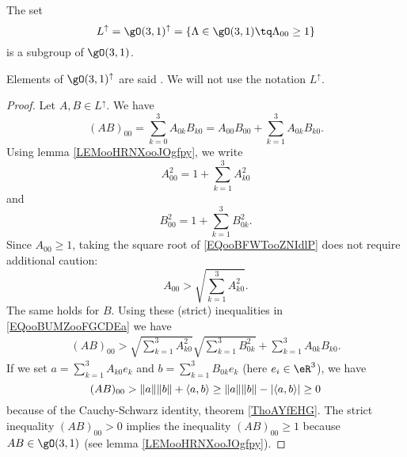 \begin{lemma}       \label{LEMooEKXWooLEMBIj}
	The set
	\begin{equation}
		L^{\uparrow}=\gO(3,1)^{\uparrow}=\{ \Lambda\in\gO(3,1)\tq \Lambda_{00}\geq 1 \}
	\end{equation}
	is a subgroup of \( \gO(3,1)\).

	Elements of \( \gO(3,1)^{\uparrow}\) are said . We will not use the notation \( L^{\uparrow}\).
\end{lemma}

\begin{proof}
	Let \( A,B\in L^{\uparrow}\). We have
	\begin{equation}        \label{EQooBUMZooFGCDEa}
		(AB)_{00}=\sum_{k=0}^3A_{0k}B_{k0}=A_{00}B_{00}+\sum_{k=1}^3A_{0k}B_{k0}.
	\end{equation}
	Using lemma \ref{LEMooHRNXooJOgfpy}, we write
	\begin{equation}        \label{EQooBFWTooZNIdlP}
		A_{00}^2=1+\sum_{k=1}^3A_{k0}^2
	\end{equation}
	and
	\begin{equation}
		B_{00}^2=1+\sum_{k=1}^3B_{0k}^2.
	\end{equation}
	Since \( A_{00}\geq 1\), taking the square root of \eqref{EQooBFWTooZNIdlP} does not require additional caution:
	\begin{equation}
		A_{00}>\sqrt{ \sum_{k=1}^3A_{k0}^2 }.
	\end{equation}
	The same holds for \( B\). Using these (strict) inequalities in \eqref{EQooBUMZooFGCDEa} we have
	\begin{subequations}
		\begin{align}
			(AB)_{00}>\sqrt{ \sum_{k=1}^3A_{k0}^2 }\sqrt{ \sum_{k=1}^3B_{0k}^2 }+\sum_{k=1}^3A_{0k}B_{k0}.
		\end{align}
	\end{subequations}
	If we set \( a=\sum_{k=1}^3A_{k0}e_k\) and \( b=\sum_{k=1}^3B_{0k}e_k\) (here \( e_i\in \eR^3\)), we have
	\begin{equation}
		(AB)_{00}>\| a \|\| b \|+\langle a, b\rangle \\
		\geq \| a \|\| b \|-| \langle a, b\rangle  |\\
		\geq 0
	\end{equation}
	because of the Cauchy-Schwarz identity, theorem \ref{ThoAYfEHG}. The strict inequality \( (AB)_{00}>0\) implies the inequality \( (AB)_{00}\geq 1\) because \( AB\in \gO(3,1)\) (see lemma \ref{LEMooHRNXooJOgfpy}).
\end{proof}

